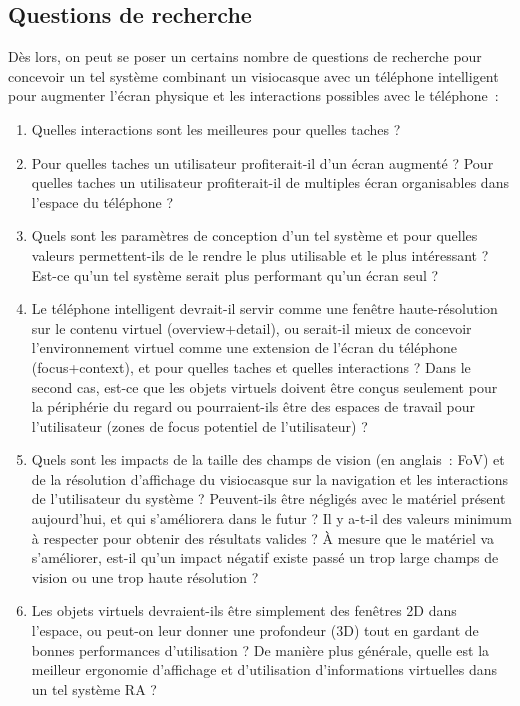 \subsection*{Questions de recherche}
Dès lors, on peut se poser un certains nombre de questions de recherche pour concevoir un tel système combinant un visiocasque avec un téléphone intelligent pour augmenter l'écran physique et les interactions possibles avec le téléphone~:
\begin{enumerate}
	\item Quelles interactions sont les meilleures pour quelles taches ?
	\item Pour quelles taches un utilisateur profiterait-il d'un écran augmenté ? Pour quelles taches un utilisateur profiterait-il de multiples écran organisables dans l'espace du téléphone ?
	\item Quels sont les paramètres de conception d'un tel système et pour quelles valeurs permettent-ils de le rendre le plus utilisable et le plus intéressant ? Est-ce qu'un tel système serait plus performant qu'un écran seul ?
	\item Le téléphone intelligent devrait-il servir comme une fenêtre haute-résolution sur le contenu virtuel (overview+detail), ou serait-il mieux de concevoir l'environnement virtuel comme une extension de l'écran du téléphone (focus+context), et pour quelles taches et quelles interactions ? Dans le second cas, est-ce que les objets virtuels doivent être conçus seulement pour la périphérie du regard ou pourraient-ils être des espaces de travail pour l'utilisateur (zones de focus potentiel de l'utilisateur) ?
	\item Quels sont les impacts de la taille des champs de vision (en anglais~: FoV) et de la résolution d'affichage du visiocasque sur la navigation et les interactions de l'utilisateur du système ? Peuvent-ils être négligés avec le matériel présent aujourd'hui, et qui s'améliorera dans le futur ? Il y a-t-il des valeurs minimum à respecter pour obtenir des résultats valides ? À mesure que le matériel va s'améliorer, est-il qu'un impact négatif existe passé un trop large champs de vision ou une trop haute résolution ?
	\item Les objets virtuels devraient-ils être simplement des fenêtres 2D dans l'espace, ou peut-on leur donner une profondeur (3D) tout en gardant de bonnes performances d'utilisation ? De manière plus générale, quelle est la meilleur ergonomie d'affichage et d'utilisation d'informations virtuelles dans un tel système RA ?
\end{enumerate}

